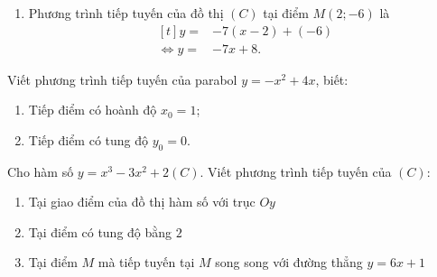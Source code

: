 \begin{bt}
\begin{bt}
{\begin{enumerate}
$$\begin{aligned}[t]
	=&\lim\limits_{x\to 2}(-2x-3)=-7.\\
	\end{aligned}$$
	\item Phương trình tiếp tuyến của đồ thị $(C)$ tại điểm $M(2;-6)$ là
	$$\begin{aligned}[t]
	y=&-7(x-2)+(-6)\\
	\Leftrightarrow y=&-7x+8.
	\end{aligned}$$
	\end{enumerate}
	}
\end{bt}
\begin{bt}%
Viết phương trình tiếp tuyến của parabol $y=-x^2+4x$, biết:
\begin{enumerate}
	\item Tiếp điểm có hoành độ $x_0=1$;
	\item Tiếp điểm có tung độ $y_0=0$.
\end{enumerate}	
\end{bt}
\begin{bt}%
	Cho hàm số $y=x^{3}-3x^{2}+2(C)$. Viết phương trình tiếp tuyến của $(C)$:\begin{enumerate}
	\item Tại giao điểm của đồ thị hàm số với trục $Oy$
	\item Tại điểm có tung độ bằng $2$
	\item Tại điểm $M$ mà tiếp tuyến tại $M$ song song với đường thẳng $y=6x+1$

\end{enumerate}
\end{bt}
\end{bt}

